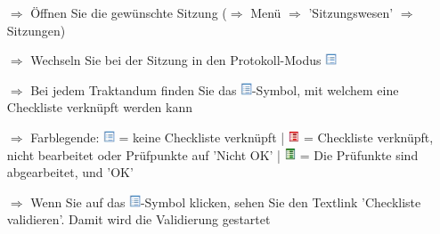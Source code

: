\documentclass{article}
\begin{document}
\begin{multicols}{2}

\begin{tcolorbox}[colback=blue!5,colframe=blue!40!black,title=Einbindung der Checklisten beim Sitzungswesen]
\begin{itemize}
  \item[$\Longrightarrow$] Öffnen Sie die gewünschte Sitzung ($\Rightarrow$ Menü $\Rightarrow$ 'Sitzungswesen' $\Rightarrow$ Sitzungen)
  \item[$\Longrightarrow$] Wechseln Sie bei der Sitzung in den Protokoll-Modus \includegraphics[height=10pt]{Icons/Listensymbol.png}
	\item[$\Longrightarrow$] Bei jedem Traktandum finden Sie das \includegraphics[height=10pt]{Icons/Listensymbol.png}-Symbol, mit welchem eine Checkliste verknüpft werden kann
		\item[$\Longrightarrow$] Farblegende: \includegraphics[height=10pt]{Icons/Listensymbol.png} = keine Checkliste verknüpft | \includegraphics[height=10pt]{Icons/Liste_rot.png} = Checkliste verknüpft, nicht bearbeitet oder Prüfpunkte auf 'Nicht OK' | \includegraphics[height=10pt]{Icons/Liste_gruen.png} = Die Prüfunkte sind abgearbeitet, und 'OK'
  \item[$\Longrightarrow$] Wenn Sie auf das \includegraphics[height=10pt]{Icons/Listensymbol.png}-Symbol klicken, sehen Sie den Textlink 'Checkliste validieren'. Damit wird die Validierung gestartet
\end{itemize}
\end{tcolorbox}



\end{multicols}
\end{document}
